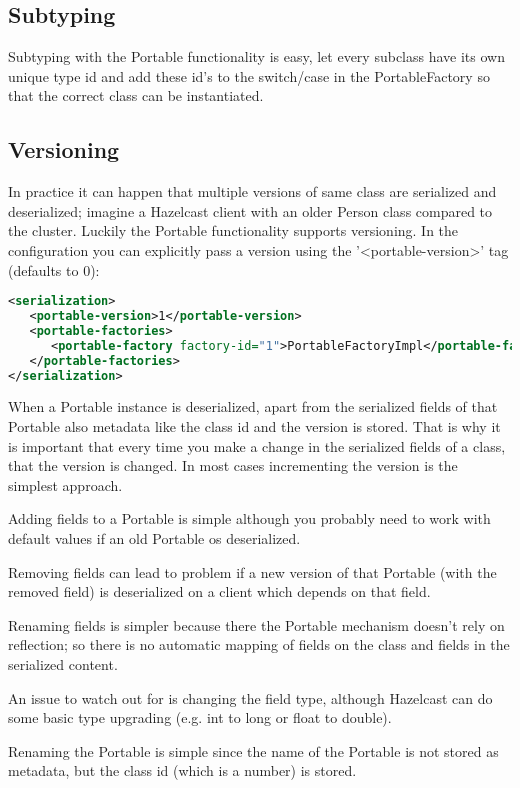 \subsection*{Subtyping}
Subtyping with the Portable functionality is easy, let every subclass have its own unique type id and add these id's to the switch/case in the PortableFactory so that the correct class can be instantiated. 

\subsection*{Versioning}
In practice it can happen that multiple versions of same class are serialized and deserialized; imagine a Hazelcast client with an older Person class compared to the cluster. Luckily the Portable functionality supports versioning. In the configuration you can explicitly pass a version using the '<portable-version>' tag (defaults to 0):
\begin{lstlisting}[language=xml]
<serialization>
   <portable-version>1</portable-version>
   <portable-factories>
      <portable-factory factory-id="1">PortableFactoryImpl</portable-factory>
   </portable-factories>
</serialization>
\end{lstlisting}
When a Portable instance is deserialized, apart from the serialized fields of that Portable also metadata like the class id and the version is stored. That is why it is important that every time you make a change in the serialized fields of a class, that the version is changed. In most cases incrementing the version is the simplest approach.

Adding fields to a Portable is simple although you probably need to work with default values if an old Portable os deserialized. 

Removing fields can lead to problem if a new version of that Portable (with the removed field) is deserialized on a client which depends on that field. 

Renaming fields is simpler because there the Portable mechanism doesn't rely on reflection; so there is no automatic mapping of fields on the class and fields in the serialized content.

An issue to watch out for is changing the field type, although Hazelcast can do some basic type upgrading (e.g. int to long or float to double). 

Renaming the Portable is simple since the name of the Portable is not stored as metadata, but the class id (which is a number) is stored.

